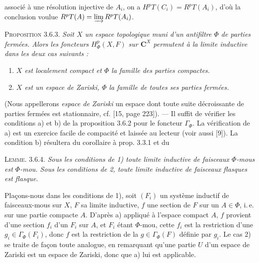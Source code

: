 
\noindent associé à une résolution injective de $A_i$, on a
$H^pT(C_i)=R^pT(A_i)$, d'où la conclusion voulue
$R^pT(A)=\varinjlim R^pT(A_i)$.

\indent\textsc{Proposition 3.6.3.} \textit{Soit $X$ un espace
topologique muni d'un antifiltre $\Phi$ de parties fermées. Alors les foncteurs
$H^p_\Phi(X,F)$ sur $\mathbf C^X$ permutent à la limite inductive dans les deux cas
suivants :}
\begin{enumerate}
\item \textit{$X$ est localement compact et $\Phi$ la famille des parties
compactes.}
\item \textit{$X$ est un espace de Zariski, $\Phi$ la famille de toutes ses
parties fermées.}
\end{enumerate}

(Nous appellerons \textit{espace de Zariski} un espace dont toute suite
décroissante de parties fermées est stationnaire, cf. [15, page 223]). ---
Il suffit de vérifier les conditions a) et b) de la proposition 3.6.2 pour le
foncteur $\Gamma_\Phi$. La vérification de a) est un exercice facile de
compacité et laissée au lecteur (voir aussi [9]). La condition b) résultera du
corollaire à prop. 3.3.1 et du

\indent\textsc{Lemme. 3.6.4.} \textit{Sous les conditions de \textup{1)} toute
limite inductive de faisceaux $\Phi$-mous est $\Phi$-mou. Sous les conditions
de \textup{2}, toute limite inductive de faisceaux flasques est flasque.}

Plaçons-nous dans les conditions de 1), soit $(F_i)$ un système inductif de
faisceaux-mous sur $X$, $F$ sa limite inductive, $f$ une section de $F$
sur un $A\in\Phi$, i.\,e. sur une partie compacte $A$. D'après a) appliqué à
l'espace compact $A$, $f$ provient d'une section $f_i$ d'un $F_i$ sur $A$, et
$F_i$ étant $\Phi$-mou, cette $f_i$ est la restriction d'une
$g_i\in\Gamma_\Phi(F_i)$, donc $f$ est la restriction de la
$g\in\Gamma_\Phi(F)$ définie par $g_i$. Le cas 2) se traite de façon toute
analogue, en remarquant qu'une partie $U$ d'un espace de Zariski est un espace
de Zariski, donc que a) lui est applicable.

